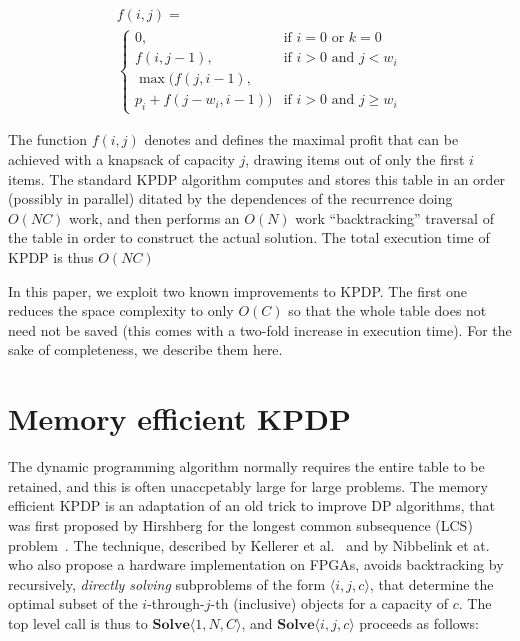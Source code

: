 
\begin{equation} \label{eq:KPDP}
  \begin{array}{l}
    f(i,j) =  \\
    \left\{
    \begin{array}{ll}
      0,  & \text{if } i=0 \text{ or }k=0\\
      f(i,j-1),        & \text{if } i>0 \text{ and } j<w_i\\
      \max(f(j,i-1),\\
      p_i + f(j-w_i , i-1))   & \text{if } i>0 \text{ and } j \geq w_i
    \end{array} \right.
  \end{array}
\end{equation}

The function $f(i,j)$ denotes and defines the maximal profit that can be
achieved with a knapsack of capacity $j$, drawing items out of only the first
$i$ items.  The standard KPDP algorithm computes and stores this table in an
order (possibly in parallel) ditated by the dependences of the recurrence
doing $O(NC)$ work, and then performs an $O(N)$ work ``backtracking''
traversal of the table in order to construct the actual solution.  The total
execution time of KPDP is thus $O(NC)$

In this paper, we exploit two known improvements to KPDP.  The first one
reduces the space complexity to only $O(C)$ so that the whole table does not
need not be saved (this comes with a two-fold increase in execution time). For
the sake of completeness, we describe them here.

\section{Memory efficient KPDP}

The dynamic programming algorithm normally requires the entire table to be
retained, and this is often unaccpetably large for large problems.  The memory
efficient KPDP is an adaptation of an old trick to improve DP algorithms, that
was first proposed by Hirshberg for the longest common subsequence (LCS)
problem~\cite{Hirschberg-CACM-1975}.  The technique, described by Kellerer et
al.~\cite[pp 46-50]{Kellerer-etal-KP-book-2004} and by Nibbelink et
at.~\cite{sanjay-asap07} who also propose a hardware implementation on FPGAs,
avoids backtracking by recursively, \emph{directly solving} subproblems of the
form $\langle i, j, c \rangle$, that determine the optimal subset of the
$i$-through-$j$-th (inclusive) objects for a capacity of $c$.  The top level
call is thus to $\mathbf{Solve} \langle 1, N, C \rangle$, and
$\mathbf{Solve} \langle i, j, c \rangle$ proceeds as follows:

